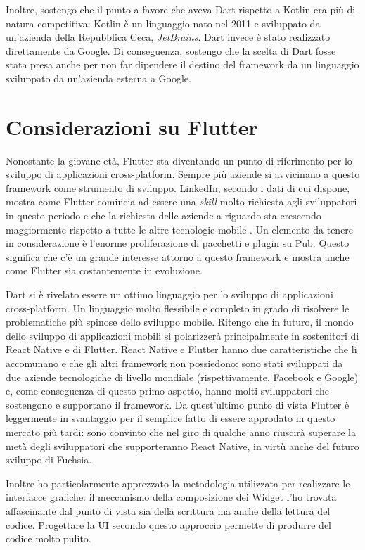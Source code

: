 Inoltre, sostengo che il punto a favore che aveva Dart rispetto a Kotlin era più di natura competitiva: Kotlin è un linguaggio nato nel 2011 e sviluppato da un'azienda della Repubblica Ceca, \textit{JetBrains}. Dart invece è stato realizzato direttamente da Google. Di conseguenza, sostengo che la scelta di Dart fosse stata presa anche per non far dipendere il destino del framework da un linguaggio sviluppato da un'azienda esterna a Google.

\section{Considerazioni su Flutter}
Nonostante la giovane età, Flutter sta diventando un punto di riferimento per lo sviluppo di applicazioni cross-platform. Sempre più aziende si avvicinano a questo framework come strumento di sviluppo. LinkedIn, secondo i dati di cui dispone, mostra come Flutter comincia ad essere una \textit{skill} molto richiesta agli sviluppatori in questo periodo e che la richiesta delle aziende a riguardo sta crescendo maggiormente rispetto a tutte le altre tecnologie mobile \cite{flutter_skill}. Un elemento da tenere in considerazione è l'enorme proliferazione di pacchetti e plugin su Pub. Questo significa che c'è un grande interesse attorno a questo framework e mostra anche come Flutter sia costantemente in evoluzione.

Dart si è rivelato essere un ottimo linguaggio per lo sviluppo di applicazioni cross-platform. Un linguaggio molto flessibile e completo in grado di risolvere le problematiche più spinose dello sviluppo mobile. Ritengo che in futuro, il mondo dello sviluppo di applicazioni mobili si polarizzerà principalmente in sostenitori di React Native e di Flutter. React Native e Flutter hanno due caratteristiche che li accomunano e che gli altri framework non possiedono: sono stati sviluppati da due aziende tecnologiche di livello mondiale (rispettivamente, Facebook e Google) e, come conseguenza di questo primo aspetto, hanno molti sviluppatori che sostengono e supportano il framework. Da quest'ultimo punto di vista Flutter è leggermente in svantaggio per il semplice fatto di essere approdato in questo mercato più tardi: sono convinto che nel giro di qualche anno riuscirà superare la metà degli sviluppatori che supporteranno React Native, in virtù anche del futuro sviluppo di Fuchsia.

Inoltre ho particolarmente apprezzato la metodologia utilizzata per realizzare le interfacce grafiche: il meccanismo della composizione dei Widget l'ho trovata affascinante dal punto di vista sia della scrittura ma anche della lettura del codice. Progettare la UI secondo questo approccio permette di produrre del codice molto pulito.

